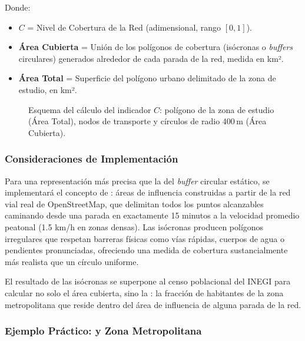 Donde:
\begin{itemize}
    \item $C$ = Nivel de Cobertura de la Red (adimensional, rango $[0, 1]$).
    \item \textbf{Área Cubierta} = Unión de los polígonos de cobertura (isócronas o
    \textit{buffers} circulares) generados alrededor de cada parada de la red,
    medida en km².
    \item \textbf{Área Total} = Superficie del polígono urbano delimitado de la zona
    de estudio, en km².
\end{itemize}

\DIFdelbegin {}\DIFdelend %
\begin{figure}[H]
    \centering
    \caption[Diagrama del indicador de Cobertura $C$]{Esquema del cálculo del
    indicador $C$: polígono de la zona de estudio (Área Total), nodos de transporte
    y círculos de radio 400\,m (Área Cubierta).}
    \label{fig:indicador-C}
\end{figure}


\subsubsection{Consideraciones de Implementación}

Para una representación más precisa que la del \textit{buffer} circular estático, se
implementará el concepto de : áreas de influencia construidas a
partir de la red vial real de OpenStreetMap, que delimitan todos los puntos
alcanzables caminando desde una parada en exactamente 15 minutos a la velocidad
promedio peatonal (1.5 km/h en zonas densas). Las isócronas producen polígonos
irregulares que respetan barreras físicas como vías rápidas, cuerpos de agua o
pendientes pronunciadas, ofreciendo una medida de cobertura sustancialmente más
realista que un círculo uniforme.

El resultado de las isócronas se superpone al censo poblacional del INEGI para
calcular no solo el área cubierta, sino la : la fracción de
habitantes de la zona metropolitana que reside dentro del área de influencia de
alguna parada de la red.

\subsubsection{Ejemplo Práctico: \cdmx{} y Zona Metropolitana}

